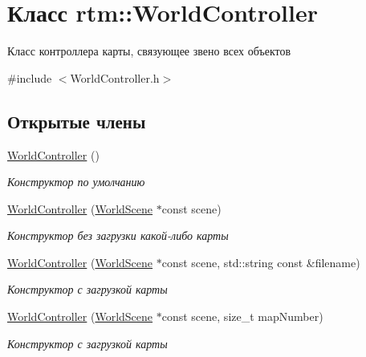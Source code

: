\hypertarget{classrtm_1_1_world_controller}{}\section{Класс rtm\+:\+:World\+Controller}
\label{classrtm_1_1_world_controller}


Класс контроллера карты, связующее звено всех объектов  




{\ttfamily \#include $<$World\+Controller.\+h$>$}

\subsection*{Открытые члены}
\begin{DoxyCompactItemize}
\item 
\mbox{\label{classrtm_1_1_world_controller_a177ef24d8d2c834ca1c3d0ed5b9dff02}} 
\hyperlink{classrtm_1_1_world_controller_a177ef24d8d2c834ca1c3d0ed5b9dff02}{World\+Controller} ()
\begin{DoxyCompactList}\small\item\em Конструктор по умолчанию \end{DoxyCompactList}\item 
\hyperlink{classrtm_1_1_world_controller_a6c7b626c306b63f5799ed3b37e7de7a4}{World\+Controller} (\hyperlink{classrtm_1_1_world_scene}{World\+Scene} $\ast$const scene)
\begin{DoxyCompactList}\small\item\em Конструктор без загрузки какой-\/либо карты \end{DoxyCompactList}\item 
\hyperlink{classrtm_1_1_world_controller_abe5fb63dc74f98dd25e1896d567d5caf}{World\+Controller} (\hyperlink{classrtm_1_1_world_scene}{World\+Scene} $\ast$const scene, std\+::string const \&filename)
\begin{DoxyCompactList}\small\item\em Конструктор с загрузкой карты \end{DoxyCompactList}\item 
\hyperlink{classrtm_1_1_world_controller_ac2f5bcddd4192807bb5ea30440d3defc}{World\+Controller} (\hyperlink{classrtm_1_1_world_scene}{World\+Scene} $\ast$const scene, size\+\_\+t map\+Number)
\begin{DoxyCompactList}\small\item\em Конструктор с загрузкой карты \end{DoxyCompactList}\item 

\end{DoxyCompactItemize}
